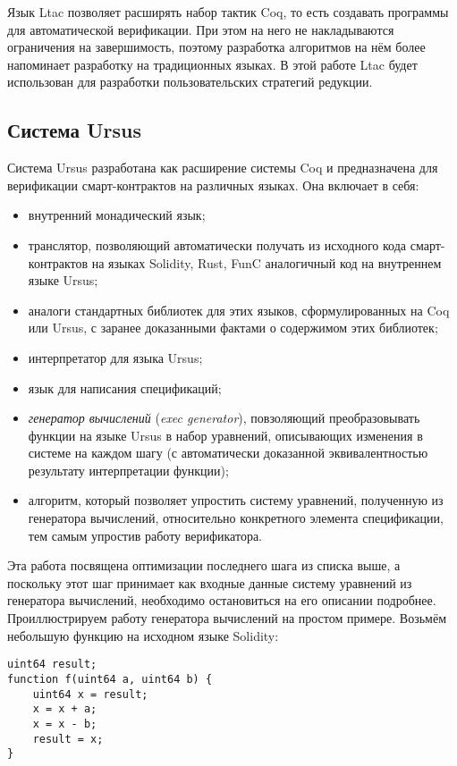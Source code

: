 \documentclass[../diploma.tex]{subfiles}
\begin{document}
Язык Ltac позволяет расширять набор тактик Coq, то есть создавать программы для автоматической верификации. При этом на него не накладываются ограничения на завершимость, поэтому разработка алгоритмов на нём более напоминает разработку на традиционных языках. В этой работе Ltac будет использован для разработки пользовательских стратегий редукции.

\subsection{Система Ursus} \label{ursus}

Система Ursus разработана как расширение системы Coq и предназначена для верификации смарт-контрактов на различных языках. Она включает в себя:
\begin{itemize}
    \item внутренний монадический язык;
    \item транслятор, позволяющий автоматически получать из исходного кода смарт-контрактов на языках Solidity, Rust, FunC аналогичный код на внутреннем языке Ursus;
    \item аналоги стандартных библиотек для этих языков, сформулированных на Coq или Ursus, с заранее доказанными фактами о содержимом этих библиотек;
    \item интерпретатор для языка Ursus;
    \item язык для написания спецификаций;
    \item \textit{генератор вычислений} (\textit{exec generator}), повзоляющий преобразовывать функции на языке Ursus в набор уравнений, описывающих изменения в системе на каждом шагу (с автоматически доказанной эквивалентностью результату интерпретации функции);
    \item алгоритм, который позволяет упростить систему уравнений, полученную из генератора вычислений, относительно конкретного элемента спецификации, тем самым упростив работу верификатора.
\end{itemize}

Эта работа посвящена оптимизации последнего шага из списка выше, а поскольку этот шаг принимает как входные данные систему уравнений из генератора вычислений, необходимо остановиться на его описании подробнее. Проиллюстрируем работу генератора вычислений на простом примере. Возьмём небольшую функцию на исходном языке Solidity:

\begin{verbatim}
uint64 result;
function f(uint64 a, uint64 b) {
    uint64 x = result;
    x = x + a;
    x = x - b;
    result = x;
}
\end{verbatim}
\end{document}
